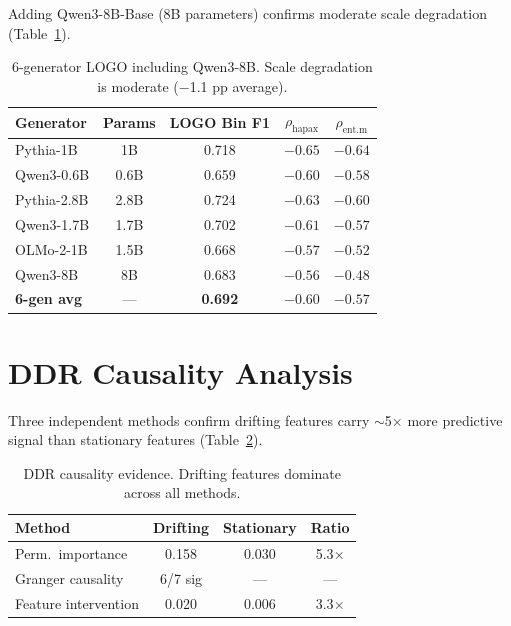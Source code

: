 \documentclass[11pt,a4paper]{article}
\begin{document}
Adding Qwen3-8B-Base (8B parameters) confirms moderate scale degradation (Table~\ref{tab:scale}).

\begin{table}[h]
\centering
\small
\begin{tabular}{lcccc}
\toprule
\textbf{Generator} & \textbf{Params} & \textbf{LOGO Bin F1} & \textbf{$\rho_\text{hapax}$} & \textbf{$\rho_\text{ent.m}$} \\
\midrule
Pythia-1B & 1B & 0.718 & $-0.65$ & $-0.64$ \\
Qwen3-0.6B & 0.6B & 0.659 & $-0.60$ & $-0.58$ \\
Pythia-2.8B & 2.8B & 0.724 & $-0.63$ & $-0.60$ \\
Qwen3-1.7B & 1.7B & 0.702 & $-0.61$ & $-0.57$ \\
OLMo-2-1B & 1.5B & 0.668 & $-0.57$ & $-0.52$ \\
Qwen3-8B & 8B & 0.683 & $-0.56$ & $-0.48$ \\
\midrule
\textbf{6-gen avg} & — & \textbf{0.692} & $-0.60$ & $-0.57$ \\
\bottomrule
\end{tabular}
\caption{6-generator LOGO including Qwen3-8B. Scale degradation is moderate ($-$1.1 pp average).}
\label{tab:scale}
\end{table}

\section{DDR Causality Analysis}
\label{app:causality}

Three independent methods confirm drifting features carry $\sim$5$\times$ more predictive signal than stationary features (Table~\ref{tab:causality}).

\begin{table}[h]
\centering
\small
\begin{tabular}{lccc}
\toprule
\textbf{Method} & \textbf{Drifting} & \textbf{Stationary} & \textbf{Ratio} \\
\midrule
Perm.\ importance & 0.158 & 0.030 & 5.3$\times$ \\
Granger causality & 6/7 sig & — & — \\
Feature intervention & 0.020 & 0.006 & 3.3$\times$ \\
\bottomrule
\end{tabular}
\caption{DDR causality evidence. Drifting features dominate across all methods.}
\label{tab:causality}
\end{table}
\end{document}
